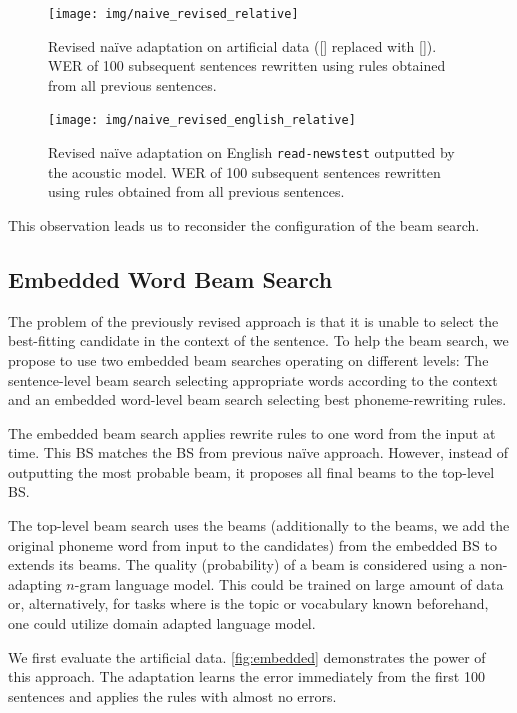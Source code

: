 \begin{figure}[h]
	\texttt{[image: img/naive\_revised\_relative]}
	\caption{Revised na\"ive adaptation on artificial data ([] replaced with []). WER of 100 subsequent sentences rewritten using rules obtained from all previous sentences.}
	\label{fig:naive_revised} 
\end{figure}

\begin{figure}[h]
	\texttt{[image: img/naive\_revised\_english\_relative]}
	\caption{Revised na\"ive adaptation on English \texttt{read-newstest} outputted by the acoustic model. WER of 100 subsequent sentences rewritten using rules obtained from all previous sentences.}
	\label{fig:naive_revised_en} 
\end{figure}

This observation leads us to reconsider the configuration of the beam search.

\subsection{Embedded Word Beam Search}
The problem of the previously revised approach is that it is unable to select the best-fitting candidate in the context of the sentence. To help the beam search, we propose to use two embedded beam searches operating on different levels: The sentence-level beam search selecting appropriate words according to the context and an embedded word-level beam search selecting best phoneme-rewriting rules.

The embedded beam search applies rewrite rules to one word from the input at time. This BS matches the BS from previous na\"ive approach. However, instead of outputting the most probable beam, it proposes all final beams to the top-level BS.

The top-level beam search uses the beams (additionally to the beams, we add the original phoneme word from input to the candidates) from the embedded BS to extends its beams. The quality (probability) of a beam is considered using a non-adapting $n$-gram language model. This could be trained on large amount of data or, alternatively, for tasks where is the topic or vocabulary known beforehand, one could utilize domain adapted language model. 

We first evaluate the artificial data. \cref{fig:embedded} demonstrates the power of this approach. The adaptation learns the error immediately from the first 100 sentences and applies the rules with almost no errors.

